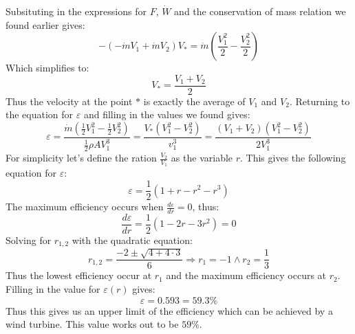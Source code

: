 \documentclass[11pt, a4paper]{article}
\renewcommand\epsilon{\varepsilon}
\begin{document}
Subsituting in the expressions for $F$, $\dot{W}$ and the conservation of mass relation we found earlier gives:
\begin{equation*}
  -(-\dot{m}V_1+\dot{m}V_2)V_* = \dot{m} \left( \frac{V_1^2}{2} - \frac{V_2^2}{2} \right)  
\end{equation*}
Which simplifies to:
\begin{equation*}
  V_* = \frac{V_1 + V_2}{2}
\end{equation*}
Thus the velocity at the point $*$ is exactly the average of $V_1$ and $V_2$. Returning to the equation for $\epsilon$ and filling in the values we found gives:
\begin{equation*}
  \epsilon = \frac{\dot{m}\left( \frac{1}{2}V_1^2 - \frac{1}{2}V_2^2 \right)}{\frac{1}{2}\rho A V_1^3} = \frac{V_*(V_1^2 - V_2^2)}{v_1^3} = \frac{(V_1 + V_2)(V_1^2 - V_2^2)}{2V_1^3}
\end{equation*}
For simplicity let's define the ration $\frac{V_2}{V_1}$ as the variable $r$. This gives the following equation for $\epsilon$:
\begin{equation*}
  \epsilon = \frac{1}{2}(1 + r - r^2 - r^3)
\end{equation*}
The maximum efficiency occurs when $\frac{d\epsilon}{dr} = 0$, thus:
\begin{equation*}
  \frac{d\epsilon}{dr} = \frac{1}{2}(1 - 2r - 3r^2) = 0
\end{equation*}
Solving for $r_{1,2}$ with the quadratic equation:
\begin{equation*}
  r_{1,2} = \frac{-2 \pm \sqrt{4 + 4\cdot 3}}{6} \Rightarrow r_1 = -1 \wedge r_2 = \frac{1}{3}
\end{equation*}
Thus the lowest efficiency occur at $r_1$ and the maximum efficiency occurs at $r_2$. Filling in the value for $\epsilon(r)$ gives:
\begin{equation*}
  \epsilon = 0.593 = 59.3\%
\end{equation*}
Thus this gives us an upper limit of the efficiency which can be achieved by a wind turbine. This value works out to be $59\%$.
\end{document}

